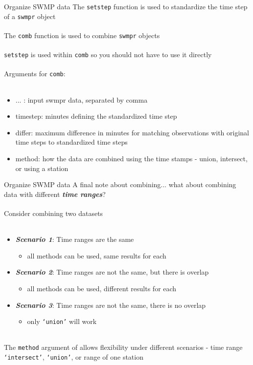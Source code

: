 \documentclass[xcolor=dvipsnames]{beamer}\usepackage[]{graphicx}\usepackage[]{color}
\newcommand{\Bigtxt}[1]{\textbf{\textit{#1}}}
\begin{document}
\begin{frame}[fragile]{Organize SWMP data}
The \texttt{setstep} function is used to standardize the time step of a \texttt{swmpr} object \\~\\
The \texttt{comb} function is used to combine \texttt{swmpr} objects \\~\\
\texttt{setstep} is used within \texttt{comb} so you should not have to use it directly \\~\\
Arguments for \texttt{comb}: \\~\\
\begin{itemize}
\item ... : input swmpr data, separated by comma
\item timestep: minutes defining the standardized time step
\item differ: maximum difference in minutes for matching observations with original time steps to standardized time steps
\item method: how the data are combined using the time stamps - union, intersect, or using a station
\end{itemize}
\end{frame}

\begin{frame}[fragile]{Organize SWMP data}
A final note about combining... what about combining data with different \Bigtxt{time ranges}?\\~\\
Consider combining two datasets \\~\\
\begin{itemize}
\item {} \Bigtxt{Scenario 1}: Time ranges are the same
\begin{itemize}
\item {} all methods can be used, same results for each
\end{itemize}
\item {} \Bigtxt{Scenario 2}: Time ranges are not the same, but there is overlap
\begin{itemize}
\item {} all methods can be used, different results for each
\end{itemize}
\item {} \Bigtxt{Scenario 3}: Time ranges are not the same, there is no overlap
\begin{itemize}
\item {} only \texttt{`union'} will work \\~\\
\end{itemize}
\end{itemize}
The \texttt{method} argument of allows flexibility under different scenarios - time range \texttt{`intersect'}, \texttt{`union'}, or range of one station
\end{frame}
\end{document}
